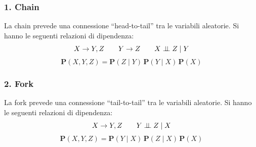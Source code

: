 \subsubsection*{1. Chain}
\begin{center}
	\begin{minipage}{0.64\textwidth}
		La chain prevede una connessione ``head-to-tail'' tra le variabili aleatorie. Si hanno le seguenti
		relazioni di dipendenza:
		\[X \to Y, Z \qquad Y \to Z \qquad X \perp \!\!\! \perp Z \mid Y\]
		\[\textbf{P}(X, Y, Z) = \textbf{P}(Z \mid Y) \, \textbf{P}(Y \mid X) \, \textbf{P}(X)\]
	\end{minipage}
	\begin{minipage}{0.35\textwidth}
		\centering
	\end{minipage}
\end{center}

\subsubsection*{2. Fork}
\begin{center}
	\begin{minipage}{0.64\textwidth}
		La fork prevede una connessione ``tail-to-tail'' tra le variabili aleatorie. Si hanno le seguenti
		relazioni di dipendenza:
		\[X \to Y, Z \qquad Y \perp \!\!\! \perp Z \mid X\]
		\[\textbf{P}(X, Y, Z) = \textbf{P}(Y \mid X) \, \textbf{P}(Z \mid X) \, \textbf{P}(X)\]
	\end{minipage}
	\begin{minipage}{0.35\textwidth}
		\centering
	\end{minipage}
\end{center}

